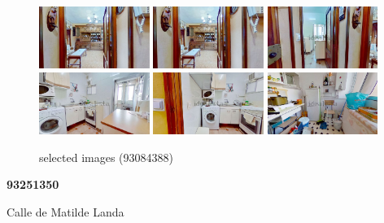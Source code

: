 \documentclass[10pt,a4paper]{report}
\begin{document}
\begin{figure}[htbp]

\includegraphics[width=0.32\textwidth]{arfima/93084388/93084388-001.jpg}
\includegraphics[width=0.32\textwidth]{arfima/93084388/93084388-002.jpg}
\includegraphics[width=0.32\textwidth]{arfima/93084388/93084388-003.jpg}
\includegraphics[width=0.32\textwidth]{arfima/93084388/93084388-004.jpg}
\includegraphics[width=0.32\textwidth]{arfima/93084388/93084388-005.jpg}
\includegraphics[width=0.32\textwidth]{arfima/93084388/93084388-006.jpg}
\caption{selected images (93084388)}
\end{figure}
\newpage
\begin{center}
\begin{large}
\textbf{93251350}\\[10px]
\end{large}
Calle de Matilde Landa
\end{center}
\end{document}

